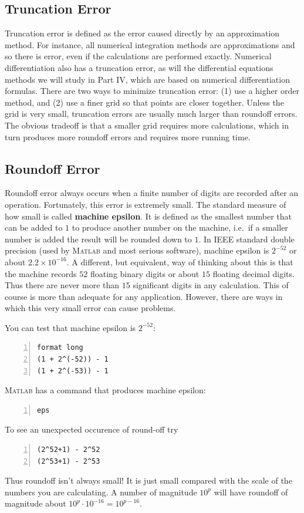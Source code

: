 

\subsection*{Truncation Error}

Truncation error is defined as the error caused directly by an
approximation method. For instance, all numerical integration methods
are approximations and so there is error, even if the calculations are
performed exactly. Numerical differentiation also has a truncation
error, as will the differential equations methods we will study in
Part IV, which are based on numerical differentiation formulas. There
are two ways to minimize truncation error: (1) use a higher order
method, and (2) use a finer grid so that points are closer
together. Unless the grid is very small, truncation errors are usually
much larger than roundoff errors. The obvious tradeoff is that a
smaller grid requires more calculations, which in turn produces more
roundoff errors and requires more running time.


\subsection*{Roundoff Error}

Roundoff error always occurs when a finite number of digits are recorded
after an operation. Fortunately, this error is extremely small. The standard
measure of how small is called {\bf machine epsilon}. It is defined as the
smallest number that can be added to $1$ to produce another number on
the machine, i.e.~if a smaller number is added the result will be rounded
down to $1$. In IEEE standard double precision (used by \textsc{Matlab}
and most serious software), machine epsilon is $2^{-52}$ or about
$2.2 \times 10^{-16}$. A different, but equivalent, way of thinking about
this is that the machine records $52$ floating binary digits or about $15$
floating decimal digits. Thus there are never more than $15$ significant digits
in any calculation. This of course is more than adequate for any application.
However, there are ways in which this very small error
can cause problems.

You can test that machine epsilon is $2^{-52}$:
\begin{lstlisting}[frame=none,numbers=left]
format long
(1 + 2^(-52)) - 1
(1 + 2^(-53)) - 1
\end{lstlisting}
\textsc{Matlab} has a command that produces machine epsilon:
\begin{lstlisting}[frame=none,numbers=left]
eps
\end{lstlisting}
To see an unexpected occurence of round-off try
\begin{lstlisting}[frame=none,numbers=left]
(2^52+1) - 2^52
(2^53+1) - 2^53
\end{lstlisting}
Thus roundoff isn't always small! It is just small compared with the scale of
the numbers you are calculating.
A number of magnitude \(10^p\) will have roundoff of magnitude about \(10^p\cdot 10^{-16}=10^{p-16}\). 


